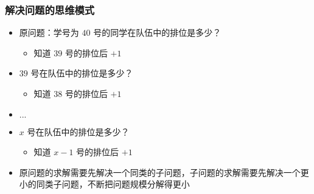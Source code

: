 \begin{frame}[fragile]
    \frametitle{解决问题的思维模式}

    \begin{itemize}
        \item 原问题：学号为 $40$ 号的同学在队伍中的排位是多少？
        \begin{itemize}
            \item<2-> 知道 $39$ 号的排位后 $+ 1$
        \end{itemize}

        \item<3-> $39$ 号在队伍中的排位是多少？
        \begin{itemize}
            \item<4-> 知道 $38$ 号的排位后 $+ 1$
        \end{itemize}

        \item<4-> $...$
        
        \item<4-> $x$ 号在队伍中的排位是多少？
        \begin{itemize}
            \item<5-> 知道 $x-1$ 号的排位后 $+ 1$
        \end{itemize}

        \vspace{1em}

        \item<6> 原问题的求解需要先解决一个同类的子问题，子问题的求解需要先解决一个更小的同类子问题，不断把问题规模分解得更小

    \end{itemize}

\end{frame}

